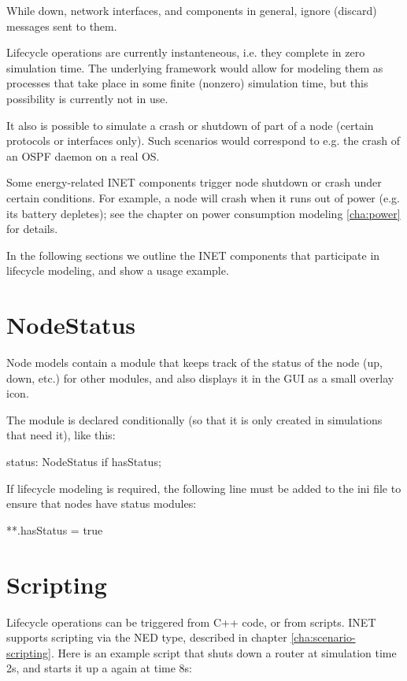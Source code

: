 While down, network interfaces, and components in general, ignore (discard)
messages sent to them.

Lifecycle operations are currently instanteneous, i.e. they complete in 
zero simulation time. The underlying framework would allow for modeling 
them as processes that take place in some finite (nonzero) simulation time, 
but this possibility is currently not in use.

It also is possible to simulate a crash or shutdown of part of a node 
(certain protocols or interfaces only). Such scenarios would correspond
to e.g. the crash of an OSPF daemon on a real OS.

Some energy-related INET components trigger node shutdown or crash under certain
conditions. For example, a node will crash when it runs out of power (e.g. its
battery depletes); see the chapter on power consumption modeling \ref{cha:power}
for details.

In the following sections we outline the INET components that
participate in lifecycle modeling, and show a usage example.

\section{NodeStatus}

Node models contain a  module that keeps track of 
the status of the node (up, down, etc.) for other modules, and also 
displays it in the GUI as a small overlay icon.

The  module is declared conditionally (so that it is
only created in simulations that need it), like this:

\begin{ned}
status: NodeStatus if hasStatus;
\end{ned}

If lifecycle modeling is required, the following line must be added 
to the ini file to ensure that nodes have status modules:

\begin{inifile}
**.hasStatus = true
\end{inifile}

\section{Scripting}

Lifecycle operations can be triggered from C++ code, or from scripts.
INET supports scripting via the  NED type, 
described in chapter \ref{cha:scenario-scripting}.
Here is an example script that shuts down a router at simulation
time 2s, and starts it up a again at time 8s:

